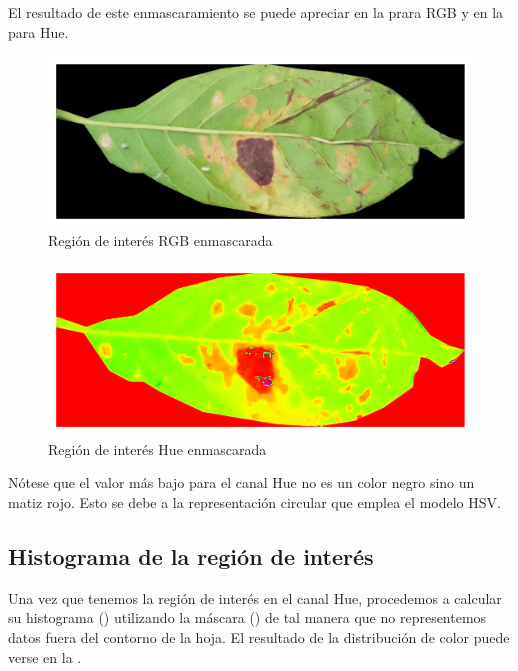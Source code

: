 El resultado de este enmascaramiento se puede apreciar en la  prara \textsf{RGB} y en la  para \textsf{Hue}.

\begin{figure}[!ht]
\centering
\includegraphics[scale=1]{images/masked_roi_rgb.png}
\caption{Región de interés RGB enmascarada}
\label{img:masked_roi_rgb}
\end{figure}

\begin{figure}[!ht]
\centering
\includegraphics[scale=1]{images/masked_roi_hue.png}
\caption{Región de interés Hue enmascarada}
\label{img:masked_roi_hue}
\end{figure}

Nótese que el valor más bajo para el canal Hue no es un color negro sino un matiz rojo. Esto se debe a la representación circular que emplea el modelo \textsf{HSV}.

\subsection{Histograma de la región de interés}
Una vez que tenemos la región de interés en el canal Hue, procedemos a calcular su histograma () utilizando la máscara () de tal manera que no representemos datos fuera del contorno de la hoja. El resultado de la distribución de color puede verse en la .

